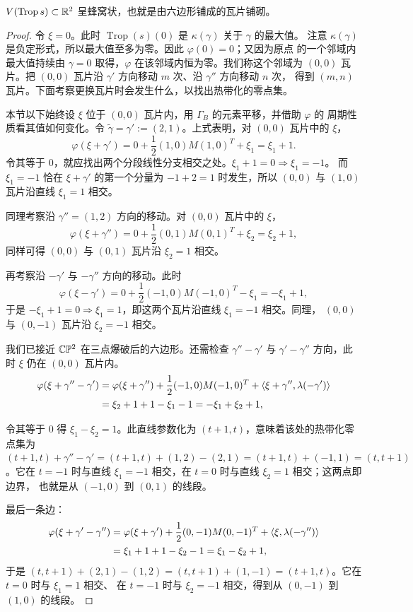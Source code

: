 \begin{claim}\label{clm:honeycomb}
$V(\operatorname{Trop}s)\subset\mathbb{R}^2$ 呈蜂窝状，也就是由六边形铺成的瓦片铺砌。
\end{claim}

\begin{proof}
令 $\xi=0$。此时 $\operatorname{Trop}(s)(0)$ 是 $\kappa(\gamma)$ 关于 $\gamma$ 的最大值。
注意 $\kappa(\gamma)$ 是负定形式，所以最大值至多为零。因此 $\varphi(0)=0$；又因为原点
的一个邻域内最大值持续由 $\gamma=0$ 取得，$\varphi$ 在该邻域内恒为零。我们称这个邻域为
$(0,0)$ 瓦片。把 $(0,0)$ 瓦片沿 $\gamma'$ 方向移动 $m$ 次、沿 $\gamma''$ 方向移动 $n$ 次，
得到 $(m,n)$ 瓦片。下面考察更换瓦片时会发生什么，以找出热带化的零点集。

本节以下始终设 $\xi$ 位于 $(0,0)$ 瓦片内，用 $\Gamma_B$ 的元素平移，并借助 $\varphi$ 的
周期性质看其值如何变化。令 $\tilde\gamma=\gamma':=(2,1)$。上式表明，对 $(0,0)$ 瓦片中的
$\xi$，
\[
\varphi(\xi+\gamma')=0+\frac12(1,0)M(1,0)^T+\xi_1=\xi_1+1.
\]
令其等于 $0$，就应找出两个分段线性分支相交之处。$\xi_1+1=0\Longrightarrow\xi_1=-1$。
而 $\xi_1=-1$ 恰在 $\xi+\gamma'$ 的第一个分量为 $-1+2=1$ 时发生，所以 $(0,0)$ 与
$(1,0)$ 瓦片沿直线 $\xi_1=1$ 相交。

同理考察沿 $\gamma''=(1,2)$ 方向的移动。对 $(0,0)$ 瓦片中的 $\xi$，
\[
\varphi(\xi+\gamma'')=0+\frac12(0,1)M(0,1)^T+\xi_2=\xi_2+1,
\]
同样可得 $(0,0)$ 与 $(0,1)$ 瓦片沿 $\xi_2=1$ 相交。

再考察沿 $-\gamma'$ 与 $-\gamma''$ 方向的移动。此时
\[
\varphi(\xi-\gamma')=0+\frac12(-1,0)M(-1,0)^T-\xi_1=-\xi_1+1,
\]
于是 $-\xi_1+1=0\Longrightarrow\xi_1=1$，即这两个瓦片沿直线 $\xi_1=-1$ 相交。同理，
$(0,0)$ 与 $(0,-1)$ 瓦片沿 $\xi_2=-1$ 相交。

我们已接近 $\mathbb{C}\mathbb{P}^2$ 在三点爆破后的六边形。还需检查 $\gamma''-\gamma'$ 与
$\gamma'-\gamma''$ 方向，此时 $\xi$ 仍在 $(0,0)$ 瓦片内。
\begin{align*}
\varphi(\xi+\gamma''-\gamma')
&=\varphi(\xi+\gamma'')+\frac12(-1,0)M(-1,0)^T
  +\langle \xi+\gamma'',\lambda(-\gamma')\rangle\\
&=\xi_2+1+1-\xi_1-1=-\xi_1+\xi_2+1,
\end{align*}

令其等于 $0$ 得 $\xi_1-\xi_2=1$。此直线参数化为 $(t+1,t)$，意味着该处的热带化零点集为
$(t+1,t)+\gamma''-\gamma'=(t+1,t)+(1,2)-(2,1)=(t+1,t)+(-1,1)=(t,t+1)$。它在
$t=-1$ 时与直线 $\xi_1=-1$ 相交，在 $t=0$ 时与直线 $\xi_2=1$ 相交；这两点即边界，
也就是从 $(-1,0)$ 到 $(0,1)$ 的线段。

最后一条边：
\begin{align*}
\varphi(\xi+\gamma'-\gamma'')
&=\varphi(\xi+\gamma')+\frac12(0,-1)M(0,-1)^T+\langle \xi,\lambda(-\gamma'')\rangle\\
&=\xi_1+1+1-\xi_2-1=\xi_1-\xi_2+1,
\end{align*}
于是 $(t,t+1)+(2,1)-(1,2)=(t,t+1)+(1,-1)=(t+1,t)$。它在 $t=0$ 时与 $\xi_1=1$ 相交、
在 $t=-1$ 时与 $\xi_2=-1$ 相交，得到从 $(0,-1)$ 到 $(1,0)$ 的线段。


\end{proof}
